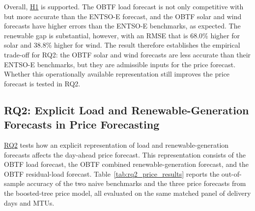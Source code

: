 Overall, \hyperlink{hyp:component_forecast_quality}{H1} is supported. The
OBTF load forecast is not only competitive with but more accurate than
the \mbox{ENTSO-E} forecast, and the OBTF solar and wind forecasts have
higher errors than the \mbox{ENTSO-E} benchmarks, as expected. The renewable gap
is substantial, however, with an RMSE that is 68.0\% higher for solar and 38.8\%
higher for wind. The
result therefore establishes the empirical trade-off for RQ2: the OBTF solar and wind forecasts are less accurate than their
\mbox{ENTSO-E} benchmarks, but they are admissible inputs for the
price forecast. Whether this operationally available
representation still improves the price forecast is tested in RQ2.

\subsection{RQ2: Explicit Load and Renewable-Generation Forecasts in Price Forecasting}
\label{sec:results_rq2}

\hyperlink{rq:price_impact_generated_forecasts}{RQ2} tests how an explicit
representation of load and renewable-generation forecasts affects the
day-ahead price forecast.
This representation consists of the OBTF load forecast, the
OBTF combined renewable-generation forecast, and the OBTF
residual-load forecast.
Table~\ref{tab:rq2_price_results} reports the
out-of-sample accuracy of the two naive benchmarks and the three price
forecasts from the boosted-tree price model, all evaluated on the same matched panel of delivery days and
MTUs.

